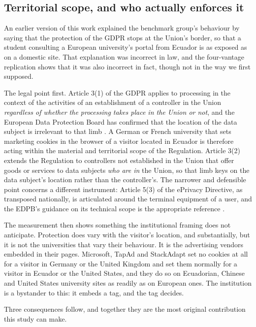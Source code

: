 \documentclass[pdflatex,sn-basic,Numbered]{sn-jnl}
\theoremstyle{thmstyleone}
\theoremstyle{thmstyletwo}
\theoremstyle{thmstylethree}
\begin{document}
\subsection{Territorial scope, and who actually enforces it}\label{sec:discussion-legal}

An earlier version of this work explained the benchmark group's behaviour by saying that the protection of the GDPR stops at the Union's border, so that a student consulting a European university's portal from Ecuador is as exposed as on a domestic site. That explanation was incorrect in law, and the four-vantage replication shows that it was also incorrect in fact, though not in the way we first supposed.

The legal point first. Article 3(1) of the GDPR applies to processing in the context of the activities of an establishment of a controller in the Union \emph{regardless of whether the processing takes place in the Union or not}, and the European Data Protection Board has confirmed that the location of the data subject is irrelevant to that limb \citep{gdpr2016,edpb2019territorial}. A German or French university that sets marketing cookies in the browser of a visitor located in Ecuador is therefore acting within the material and territorial scope of the Regulation. Article 3(2) extends the Regulation to controllers not established in the Union that offer goods or services to data subjects \emph{who are in} the Union, so that limb keys on the data subject's location rather than the controller's. The narrower and defensible point concerns a different instrument: Article 5(3) of the ePrivacy Directive, as transposed nationally, is articulated around the terminal equipment of a user, and the EDPB's guidance on its technical scope is the appropriate reference \citep{eprivacy2002,edpb2024eprivacy}.

The measurement then shows something the institutional framing does not anticipate. Protection does vary with the visitor's location, and substantially, but it is not the universities that vary their behaviour. It is the advertising vendors embedded in their pages. Microsoft, TapAd and StackAdapt set no cookies at all for a visitor in Germany or the United Kingdom and set them normally for a visitor in Ecuador or the United States, and they do so on Ecuadorian, Chinese and United States university sites as readily as on European ones. The institution is a bystander to this: it embeds a tag, and the tag decides.

Three consequences follow, and together they are the most original contribution this study can make.
\end{document}
